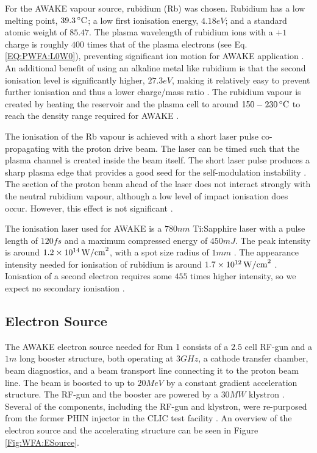 For the AWAKE vapour source, rubidium (Rb) was chosen. Rubidium has a low melting point, $39.3\celsius$; a low first ionisation energy, $4.18\unit{eV}$; and a standard atomic weight of $85.47$. The plasma wavelength of rubidium ions with a $+1$ charge is roughly $400$ times that of the plasma electrons (see Eq. \ref{EQ:PWFA:L0W0}), preventing significant ion motion for AWAKE application \cite{vieira:2012a}. An additional benefit of using an alkaline metal like rubidium is that the second ionisation level is significantly higher, $27.3\unit{eV}$, making it relatively easy to prevent further ionisation and thus a lower charge/mass ratio \cite{awake_collaboration:2017}. The rubidium vapour is created by heating the reservoir and the plasma cell to around $150-230\celsius$ to reach the density range required for AWAKE \cite{caldwell:2015,muggli:2017a}.

The ionisation of the Rb vapour is achieved with a short laser pulse co-propagating with the proton drive beam. The laser can be timed such that the plasma channel is created inside the beam itself. The short laser pulse produces a sharp plasma edge that provides a good seed for the self-modulation instability \cite{vieira:2014a}. The section of the proton beam ahead of the laser does not interact strongly with the neutral rubidium vapour, although a low level of impact ionisation does occur. However, this effect is not significant \cite{awake_collaboration:2017}.

The ionisation laser used for AWAKE is a $780\unit{nm}$ Ti:Sapphire laser with a pulse length of $120\unit{fs}$ and a maximum compressed energy of $450\unit{mJ}$. The peak intensity is around $1.2\nexp{14}\unit{W/cm}^{2}$, with a spot size radius of $1\unit{mm}$ \cite{awake_collaboration:2017}. The appearance intensity needed for ionisation of rubidium is around $1.7\nexp{12}\unit{W/cm}^{2}$ \cite{augst:1989}. Ionisation of a second electron requires some $455$ times higher intensity, so we expect no secondary ionisation \cite{muggli:2017a}.

\subsection{Electron Source}
\label{WFA:Design:ESource}

The AWAKE electron source needed for Run 1 consists of a $2.5$ cell RF-gun and a $1\unit{m}$ long booster structure, both operating at $3\unit{GHz}$, a cathode transfer chamber, beam diagnostics, and a beam transport line connecting it to the proton beam line. The beam is boosted to up to $20\unit{MeV}$ by a constant gradient acceleration structure. The RF-gun and the booster are powered by a $30\unit{MW}$ klystron \cite{awake_collaboration:2017,pepitone:2016}. Several of the components, including the RF-gun and klystron, were re-purposed from the former PHIN injector in the CLIC test facility \cite{chevallay:2012}. An overview of the electron source and the accelerating structure can be seen in Figure \ref{Fig:WFA:ESource}.

